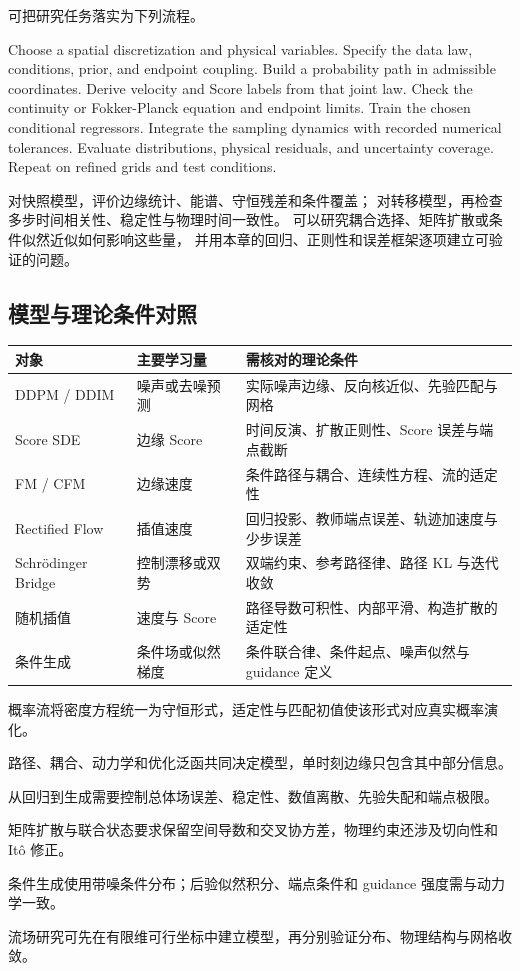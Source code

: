 可把研究任务落实为下列流程。
\begin{codeblock}[language=Pseudocode,title={带物理结构的条件生成研究流程}]
Choose a spatial discretization and physical variables.
Specify the data law, conditions, prior, and endpoint coupling.
Build a probability path in admissible coordinates.
Derive velocity and Score labels from that joint law.
Check the continuity or Fokker-Planck equation and endpoint limits.
Train the chosen conditional regressors.
Integrate the sampling dynamics with recorded numerical tolerances.
Evaluate distributions, physical residuals, and uncertainty coverage.
Repeat on refined grids and test conditions.
\end{codeblock}

对快照模型，评价边缘统计、能谱、守恒残差和条件覆盖；
对转移模型，再检查多步时间相关性、稳定性与物理时间一致性。
可以研究耦合选择、矩阵扩散或条件似然近似如何影响这些量，
并用本章的回归、正则性和误差框架逐项建立可验证的问题。

\subsection*{模型与理论条件对照}

\begingroup
\small
\noindent
\begin{tabularx}{\textwidth}{@{}llX@{}}
\toprule
对象 & 主要学习量 & 需核对的理论条件 \\
\midrule
DDPM / DDIM & 噪声或去噪预测 & 实际噪声边缘、反向核近似、先验匹配与网格 \\
Score SDE & 边缘 Score & 时间反演、扩散正则性、Score 误差与端点截断 \\
FM / CFM & 边缘速度 & 条件路径与耦合、连续性方程、流的适定性 \\
Rectified Flow & 插值速度 & 回归投影、教师端点误差、轨迹加速度与少步误差 \\
Schrödinger Bridge & 控制漂移或双势 & 双端约束、参考路径律、路径 KL 与迭代收敛 \\
随机插值 & 速度与 Score & 路径导数可积性、内部平滑、构造扩散的适定性 \\
条件生成 & 条件场或似然梯度 & 条件联合律、条件起点、噪声似然与 guidance 定义 \\
\bottomrule
\end{tabularx}
\endgroup

\begin{chaptersummary}
 \item 概率流将密度方程统一为守恒形式，适定性与匹配初值使该形式对应真实概率演化。
 \item 路径、耦合、动力学和优化泛函共同决定模型，单时刻边缘只包含其中部分信息。
 \item 从回归到生成需要控制总体场误差、稳定性、数值离散、先验失配和端点极限。
 \item 矩阵扩散与联合状态要求保留空间导数和交叉协方差，物理约束还涉及切向性和 It\^o 修正。
 \item 条件生成使用带噪条件分布；后验似然积分、端点条件和 guidance 强度需与动力学一致。
 \item 流场研究可先在有限维可行坐标中建立模型，再分别验证分布、物理结构与网格收敛。
\end{chaptersummary}

